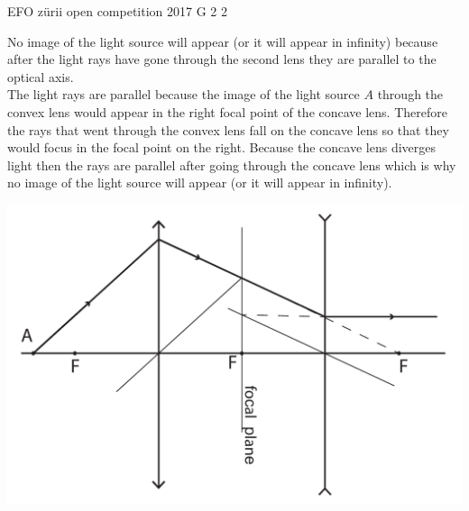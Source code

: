\documentclass[11pt]{article}
\begin{document}
{EFO zürii} %
{open competition} %
{2017} %
{G 2} %
{2} %
{

\ifEngSolution
No image of the light source will appear (or it will appear in infinity) because after the light rays have gone through the second lens they are parallel to the optical axis.\\
The light rays are parallel because the image of the light source $A$ through the convex lens would appear in the right focal point of the concave lens. Therefore the rays that went through the convex lens fall on the concave lens so that they would focus in the focal point on the right. Because the concave lens diverges light then the rays are parallel after going through the concave lens which is why no image of the light source will appear (or it will appear in infinity).
\begin{center}
	\includegraphics[width=0.7\linewidth]{2017-lahg-02-valgusallikaslah_ing}
\end{center}
\fi
}
\end{document}
